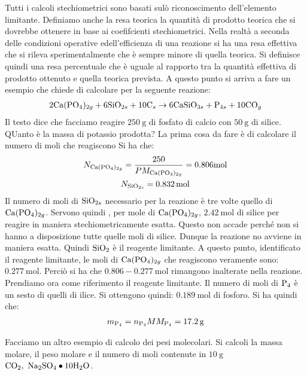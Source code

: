 \documentclass[../AppuntiChimica]{subfiles}
\begin{document}
	 Tutti i calcoli stechiometrici sono basati sulò riconoscimento dell'elemento limitante. Definiamo anche la resa teorica la quantità di prodotto teorica che si dovrebbe ottenere in base ai coefifcienti stechiometrici. Nella realtà a seconda delle condizioni operative edell'efficienza di una reazione si ha una resa effettiva che si rileva sperimentalmente che è sempre minore di quella teorica. Si definisce quindi una resa percentuale che è uguale al rapporto tra la quantità effettiva di prodotto ottenuto e quella teorica prevista. A questo punto si arriva a fare un esempio che chiede di calcolare per la seguente reazione:
	 \begin{gather}
	 2\text{Ca}(\text{P}\text{O}_{4})_{2g}+6\text{Si}\text{O}_{2s}+10\text{C}_{s}\to 6\text{Ca}\text{Si}\text{O}_{3s}+\text{P}_{4s}+10\text{CO}_{g}
	 \end{gather}
	 Il testo dice che facciamo reagire $ \SI{250}{\gram} $ di fosfato di calcio con $\SI{50}{\gram} $ di silice. QUanto è la massa di potassio prodotta?
	 La prima cosa da fare è di calcolare il numero di moli che reagiscono Si ha che:
	 \begin{gather}
		 N_{\text{Ca}(\text{P}\text{O}_{4})_{2g}}=\dfrac{250}{PM_{\text{Ca}(\text{P}\text{O}_{4})_{2g}}}=0.806\text{mol} \\
		 N_{\text{Si}\text{O}_{2s}}=\SI{0.832}{\mole}
	 \end{gather}
	Il numero di moli di $ \text{Si}\text{O}_{2s} $ necessario per la reazione è tre volte quello di $ \text{Ca}(\text{P}\text{O}_{4})_{2g} $. Servono quindi , per mole di $ \text{Ca}(\text{P}\text{O}_{4})_{2g} $, $ \SI{2.42}{\mole} $ di silice per reagire in maniera stechiometricamente esatta. Questo non accade perché non si hanno a disposizione tutte quelle moli di silice. Dunque la reazione no avviene in maniera esatta. Quindi $ \text{SiO}_{2} $ è il reagente limitante. A questo punto, identificato il reagente limitante, le moli di $ \text{Ca}(\text{P}\text{O}_{4})_{2g} $ che reagiscono veramente sono: $ \SI{0.277}{\mole} $. Perciò si ha che $ 0.806-\SI{0.277}{\mole} $ rimangono inalterate nella reazione. Prendiamo ora come riferimento il reagente limitante. Il numero di moli di $ \text{P}_{4} $ è un sesto di quelli di ilice. Si ottengono quindi: $ \SI{0.189}{\mole} $ di fosforo. Si ha quindi che:
	\begin{gather}
		m_{\text{P}_{4}}=n_{\text{P}_{4}}MM_{\text{P}_{4}}=\SI{17.2}{\gram}
	\end{gather}
	
	Facciamo un altro esempio di calcolo dei pesi molecolari. Si calcoli la massa molare, il peso molare e il numero di moli contenute in $ \SI{10}{\gram} $ $ \chem{CO}_{2},\ \chem{Na}_{2}\chem{SO}_{4}\bullet10\chem{H}_{2}\chem{O}$.
	
\end{document}
